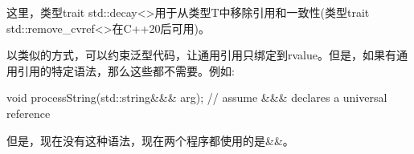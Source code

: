 这里，类型trait std::decay<>用于从类型T中移除引用和一致性(类型trait std::remove_cvref<>在C++20后可用)。

以类似的方式，可以约束泛型代码，让通用引用只绑定到rvalue。但是，如果有通用引用的特定语法，那么这些都不需要。例如:

\begin{cppcode}
void processString(std::string&&& arg); // assume &&& declares a universal reference
\end{cppcode}

但是，现在没有这种语法，现在两个程序都使用的是\&\&。




























